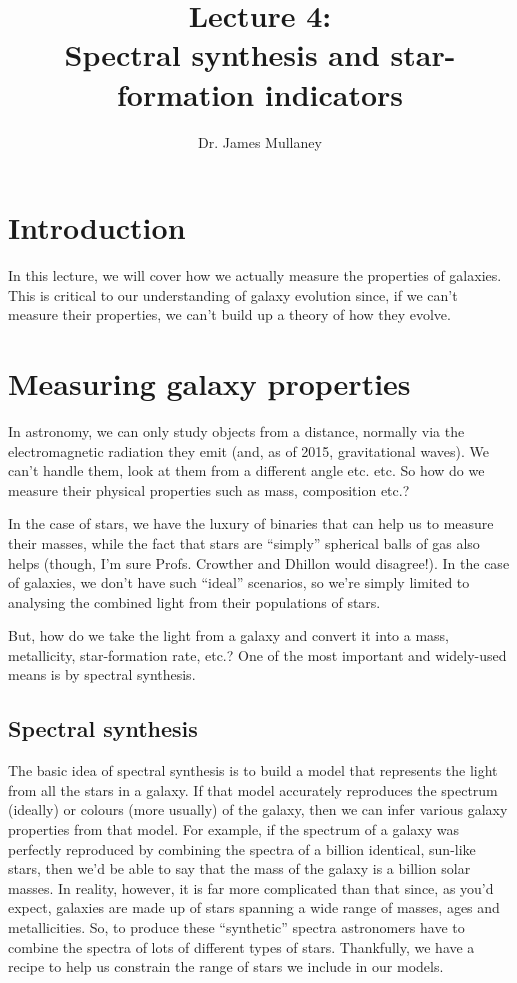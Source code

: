 \documentclass[11pt]{article}
\begin{document}
 
\title{Lecture 4:\\Spectral synthesis and star-formation indicators}
\author{Dr. James Mullaney}
\maketitle

\section{Introduction}
In this lecture, we will cover how we actually measure the properties
of galaxies. This is critical to our understanding of galaxy evolution
since, if we can't measure their properties, we can't build up a theory
of how they evolve.

\section{Measuring galaxy properties}
In astronomy, we can only study objects from a distance, normally via
the electromagnetic radiation they emit (and, as of 2015,
gravitational waves). We can't handle them, look at them from a
different angle etc. etc. So how do we measure their physical
properties such as mass, composition etc.?

In the case of stars, we have the luxury of binaries that can help us
to measure their masses, while the fact that stars are ``simply''
spherical balls of gas also helps (though, I'm sure Profs. Crowther
and Dhillon would disagree!). In the case of galaxies, we don't have
such ``ideal'' scenarios, so we're simply limited to analysing the
combined light from their populations of stars.

But, how do we take the light from a galaxy and convert it into a
mass, metallicity, star-formation rate, etc.? One of the most
important and widely-used means is by spectral synthesis.

\subsection{Spectral synthesis}
The basic idea of spectral synthesis is to build a model that
represents the light from all the stars in a galaxy. If that model
accurately reproduces the spectrum (ideally) or colours (more usually)
of the galaxy, then we can infer various galaxy properties from that
model. For example, if the spectrum of a galaxy was perfectly
reproduced by combining the spectra of a billion identical, sun-like
stars, then we'd be able to say that the mass of the galaxy is a
billion solar masses. In reality, however, it is far more complicated
than that since, as you'd expect, galaxies are made up of stars
spanning a wide range of masses, ages and metallicities. So, to
produce these ``synthetic'' spectra astronomers have to combine the
spectra of lots of different types of stars. Thankfully, we have a
recipe to help us constrain the range of stars we include in our models.
\end{document}
